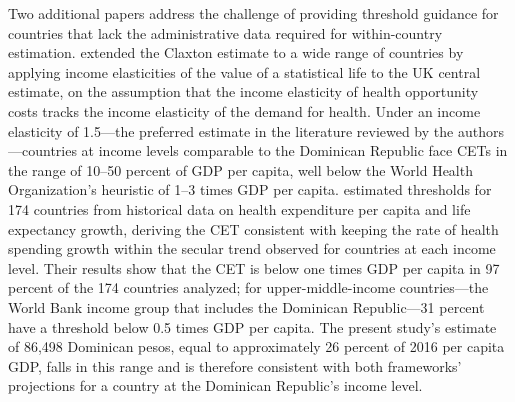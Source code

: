 \documentclass[11pt]{article}
\numberwithin{equation}{section}
\theoremstyle{remark}
\begin{document}
Two additional papers address the challenge of providing threshold guidance for countries that lack the administrative data required for within-country estimation. \citet{Woods2016} extended the Claxton estimate to a wide range of countries by applying income elasticities of the value of a statistical life to the UK central estimate, on the assumption that the income elasticity of health opportunity costs tracks the income elasticity of the demand for health. Under an income elasticity of 1.5---the preferred estimate in the literature reviewed by the authors---countries at income levels comparable to the Dominican Republic face CETs in the range of 10--50 percent of GDP per capita, well below the World Health Organization's heuristic of 1--3 times GDP per capita. \citet{PichonRiviere2023} estimated thresholds for 174 countries from historical data on health expenditure per capita and life expectancy growth, deriving the CET consistent with keeping the rate of health spending growth within the secular trend observed for countries at each income level. Their results show that the CET is below one times GDP per capita in 97 percent of the 174 countries analyzed; for upper-middle-income countries---the World Bank income group that includes the Dominican Republic---31 percent have a threshold below 0.5 times GDP per capita. The present study's estimate of 86,498 Dominican pesos, equal to approximately 26 percent of 2016 per capita GDP, falls in this range and is therefore consistent with both frameworks' projections for a country at the Dominican Republic's income level.
\end{document}

